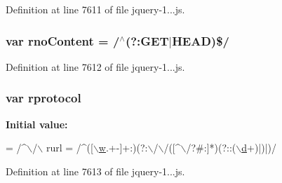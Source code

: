 Definition at line 7611 of file jquery-\/1...\+js.

\subsubsection[{\texorpdfstring{rno\+Content}{rnoContent}}]{\setlength{\rightskip}{0pt plus 5cm}var rno\+Content = /$^\wedge$(?\+:G\+ET$\vert$H\+E\+AD)\$/}\hypertarget{obj_2_release_2_package_2_package_tmp_2_scripts_2jquery-1_810_82_8js_a537d744d72e31ec312aa3f16ef576d3f}{}\label{obj_2_release_2_package_2_package_tmp_2_scripts_2jquery-1_810_82_8js_a537d744d72e31ec312aa3f16ef576d3f}


Definition at line 7612 of file jquery-\/1...\+js.

\subsubsection[{\texorpdfstring{rprotocol}{rprotocol}}]{\setlength{\rightskip}{0pt plus 5cm}var rprotocol}\hypertarget{obj_2_release_2_package_2_package_tmp_2_scripts_2jquery-1_810_82_8js_a0f02b710647fcf95e74593954fb9b4cb}{}\label{obj_2_release_2_package_2_package_tmp_2_scripts_2jquery-1_810_82_8js_a0f02b710647fcf95e74593954fb9b4cb}
{\bfseries Initial value\+:}
\begin{DoxyCode}
= /^\(\backslash\)/\(\backslash\)
    rurl = /^([\hyperlink{obj_2_release_2_package_2_package_tmp_2_scripts_2respond_8min_8js_a9721a992655f700bdc2e91ba68b71e26}{\(\backslash\)w}.+-]+:)(?:\(\backslash\)/\(\backslash\)/([^\(\backslash\)/?#:]*)(?::(\hyperlink{obj_2_release_2_package_2_package_tmp_2_scripts_2bootstrap_8min_8js_aeb337d295abaddb5ec3cb34cc2e2bbc9}{\(\backslash\)d}+)|)|)/
\end{DoxyCode}


Definition at line 7613 of file jquery-\/1...\+js.

